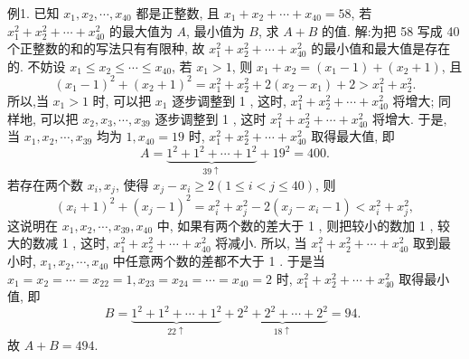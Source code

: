
例1. 已知 $x_1, x_2, \cdots, x_{40}$ 都是正整数, 且 $x_1+x_2+\cdots+x_{40}=58$, 若 $x_1^2+x_2^2+\cdots+x_{40}^2$ 的最大值为 $A$, 最小值为 $B$, 求 $A+B$ 的值.
解:为把 58 写成 40 个正整数的和的写法只有有限种, 故 $x_1^2+ x_2^2+\cdots+x_{40}^2$ 的最小值和最大值是存在的.
不妨设 $x_1 \leqslant x_2 \leqslant \cdots \leqslant x_{40}$, 若 $x_1>1$, 则 $x_1+x_2=\left(x_1-1\right)+\left(x_2+1\right)$, 且
$$
\left(x_1-1\right)^2+\left(x_2+1\right)^2=x_1^2+x_2^2+2\left(x_2-x_1\right)+2>x_1^2+x_2^2 .
$$
所以,当 $x_1>1$ 时, 可以把 $x_1$ 逐步调整到 1 , 这时, $x_1^2+x_2^2+\cdots+x_{40}^2$ 将增大; 同样地, 可以把 $x_2, x_3, \cdots, x_{39}$ 逐步调整到 1 , 这时 $x_1^2+x_2^2+\cdots+x_{40}^2$ 将增大.
于是, 当 $x_1, x_2, \cdots, x_{39}$ 均为 $1, x_{40}=19$ 时, $x_1^2+x_2^2+\cdots+x_{40}^2$ 取得最大值, 即
$$
A=\underbrace{1^2+1^2+\cdots+1^2}_{39 \uparrow}+19^2=400 .
$$
若存在两个数 $x_i, x_j$, 使得 $x_j-x_i \geqslant 2(1 \leqslant i<j \leqslant 40)$, 则
$$
\left(x_i+1\right)^2+\left(x_j-1\right)^2=x_i^2+x_j^2-2\left(x_j-x_i-1\right)<x_i^2+x_j^2,
$$
这说明在 $x_1, x_2, \cdots, x_{39}, x_{40}$ 中, 如果有两个数的差大于 1 , 则把较小的数加 1 , 较大的数减 1 , 这时, $x_1^2+x_2^2+\cdots+x_{40}^2$ 将减小.
所以, 当 $x_1^2+x_2^2+\cdots+x_{40}^2$ 取到最小时, $x_1, x_2, \cdots, x_{40}$ 中任意两个数的差都不大于 1 . 于是当 $x_1=x_2=\cdots=x_{22}=1, x_{23}=x_{24}=\cdots=x_{40}=2$ 时, $x_1^2+x_2^2+\cdots+x_{40}^2$ 取得最小值, 即
$$
B=\underbrace{1^2+1^2+\cdots+1^2}_{22 \uparrow}+\underbrace{2^2+2^2+\cdots+2^2}_{18 \uparrow}=94 \text {. }
$$
故 $A+B=494$.



